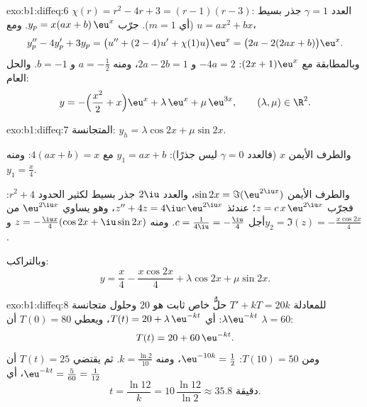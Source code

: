 \begin{solution}{exo:b1:diffeq:6}
$\chi(r) = r^2 - 4r + 3 = (r-1)(r-3)$: العدد $\gamma = 1$ جذر بسيط
(أي $m = 1$). جرّب $y_p = x(ax + b)\,\eu^x$. ومع $u = ax^2 + bx$،
\[
y_p'' - 4y_p' + 3y_p = \bigl(u'' + (2 - 4)u' + \chi(1) u\bigr)\eu^x
= \bigl(2a - 2(2ax + b)\bigr)\eu^x .
\]
وبالمطابقة مع $(2x + 1)\eu^x$: $-4a = 2$ و $2a - 2b = 1$، ومنه $a =
-\frac12$ و $b = -1$. والحل العام:
\[
y = -\Bigl(\frac{x^2}{2} + x\Bigr)\eu^{x} + \lambda\,\eu^{x} +
\mu\,\eu^{3x}, \qquad (\lambda, \mu) \in \R^2 .
\]
\end{solution}

\begin{solution}{exo:b1:diffeq:7}
المتجانسة: $y_h = \lambda\cos 2x + \mu\sin 2x$.

والطرف الأيمن $x$ (فالعدد $\gamma = 0$ ليس جذرًا): $y_1 = ax + b$ مع
$4(ax + b) = x$: ومنه $y_1 = \frac x4$.

والطرف الأيمن $\sin 2x = \Im(\eu^{2\iu x})$، والعدد $2\iu$ جذر بسيط
لكثير الحدود $r^2 + 4$: فجرّب $z = c\,x\,\eu^{2\iu x}$؛ عندئذ $z'' + 4z =
4\iu c\,\eu^{2\iu x}$، وهو يساوي $\eu^{2\iu x}$ من أجل $c =
\frac{1}{4\iu} = -\frac{\iu}{4}$. ومنه $z = -\frac{\iu x}{4}(\cos 2x +
\iu \sin 2x)$ و$y_2 = \Im(z) = -\frac{x\cos 2x}{4}$.

وبالتراكب:
\[
y = \frac{x}{4} - \frac{x\cos 2x}{4} + \lambda\cos 2x + \mu\sin 2x .
\]
\end{solution}

\begin{solution}{exo:b1:diffeq:8}
للمعادلة $T' + kT = 20k$ حلٌّ خاص ثابت هو $20$ وحلول
متجانسة $\lambda\eu^{-kt}$: أي $T(t) = 20 +
\lambda\,\eu^{-kt}$، ويعطي $T(0) = 80$ أن $\lambda = 60$:
\[
T(t) = 20 + 60\,\eu^{-kt} .
\]
ومن $T(10) = 50$: $\eu^{-10k} = \frac12$، ومنه $k = \frac{\ln 2}{10}$. ثم
يقتضي $T(t) = 25$ أن $\eu^{-kt} = \frac{5}{60} = \frac{1}{12}$، أي
\[
t = \frac{\ln 12}{k} = 10\,\frac{\ln 12}{\ln 2} \approx 35.8
\text{ دقيقة.}
\]
\end{solution}

